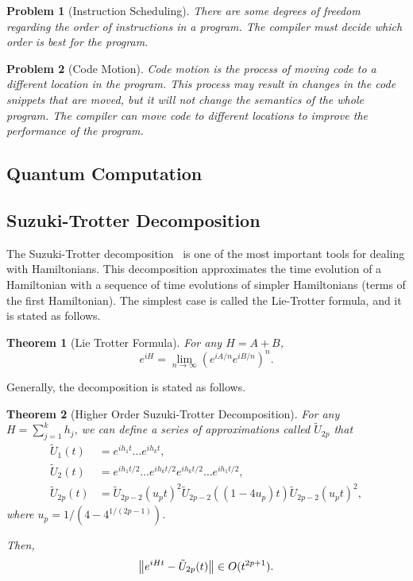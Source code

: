 \documentclass{report}
\newtheorem{theorem}{Theorem}
\newtheorem{problem}{Problem}
\begin{document}
\begin{problem}[Instruction Scheduling]
  There are some degrees of freedom regarding the order of instructions in a program. The compiler must decide which order is best for the program.~\cite[chap. 10]{allen2001}
\end{problem}

\begin{problem}[Code Motion]
  Code motion is the process of moving code to a different location in the program. This process may result in changes in the code snippets that are moved, but it will not change the semantics of the whole program. The compiler can move code to different locations to improve the performance of the program.~\cite[p. 592]{aho1986}
\end{problem}

\subsection{Quantum Computation}

\subsection{Suzuki-Trotter Decomposition}

The Suzuki-Trotter decomposition~\cite{trotter1959, suzuki1991} is one of the most important tools for dealing with Hamiltonians. This decomposition approximates the time evolution of a Hamiltonian with a sequence of time evolutions of simpler Hamiltonians (terms of the first Hamiltonian). The simplest case is called the Lie-Trotter formula, and it is stated as follows.

\begin{theorem}[Lie Trotter Formula]
For any $H = A + B$,
\begin{equation}
  e^{iH} = \lim_{n \to \infty} (e^{iA/n} e^{iB/n})^n.
\end{equation}
\end{theorem}

Generally, the decomposition is stated as follows.
\begin{theorem}[Higher Order Suzuki-Trotter Decomposition]
  For any $H = \sum_{j=1}^k h_j$, we can define a series of approximations called $\tilde{U}_{2p}$ that
  \begin{align}
\tilde{U}_1(t) &= e^{i h_1 t}\dots e^{i h_k t}, \\
\tilde{U}_2(t) &= e^{i h_1 t / 2}\dots e^{i h_k t / 2} e^{i h_k t / 2}\dots e^{i h_1 t / 2}, \\
\tilde{U}_{2p}(t) &= \tilde{U}_{2p - 2}(u_p t)^2 \tilde{U}_{2p- 2}((1 - 4u_p) t) \tilde{U}_{2p - 2}(u_p t)^2,
  \end{align}
  where $u_p = 1/(4 - 4^{1/(2p - 1)})$.

  Then, 
  \begin{equation}
    \norm{e^{iHt} - \tilde{U}_{2p}(t)} \in O(t^{2p + 1}).
  \end{equation}
\end{theorem}
\end{document}
